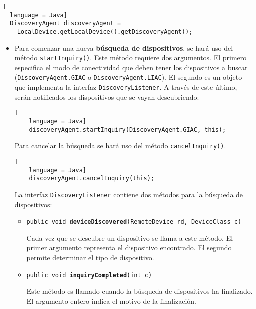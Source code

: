 \begin{itemize}
\begin{lstlisting}[
  language = Java]
  DiscoveryAgent discoveryAgent =
    LocalDevice.getLocalDevice().getDiscoveryAgent();
\end{lstlisting}
  \begin{itemize}
  \item Para comenzar una nueva \textbf{búsqueda de dispositivos}, se hará uso 
  del método \texttt{startInquiry()}. Este método requiere dos argumentos. El 
  primero especifica el modo de conectividad que deben tener los dispositivos a 
  buscar (\texttt{DiscoveryAgent.GIAC} o \texttt{DiscoveryAgent.LIAC}).
  El segundo es un objeto que implementa la interfaz
  \texttt{DiscoveryListener}. A través de este último, serán notificados los 
  dispositivos que se vayan descubriendo:

  \begin{lstlisting}[
    language = Java]
    discoveryAgent.startInquiry(DiscoveryAgent.GIAC, this);
  \end{lstlisting}

  Para cancelar la búsqueda se hará uso del método \texttt{cancelInquiry()}.

  \begin{lstlisting}[
    language = Java]
    discoveryAgent.cancelInquiry(this);
  \end{lstlisting}

  La interfaz \texttt{DiscoveryListener} contiene dos métodos para la 
  búsqueda de dispositivos:
    \begin{itemize}
    \item \texttt{public void \textbf{deviceDiscovered}(RemoteDevice rd,
      DeviceClass c)}

    Cada vez que se descubre un dispositivo se llama a este método. El primer
    argumento representa el dispositivo encontrado. El segundo permite 
    determinar el tipo de dispositivo.

    \item \texttt{public void \textbf{inquiryCompleted}(int c)}

    Este método es llamado cuando la búsqueda de dispositivos ha finalizado. El
    argumento entero indica el motivo de la finalización.
    \end{itemize}


\end{itemize}
\end{itemize}
